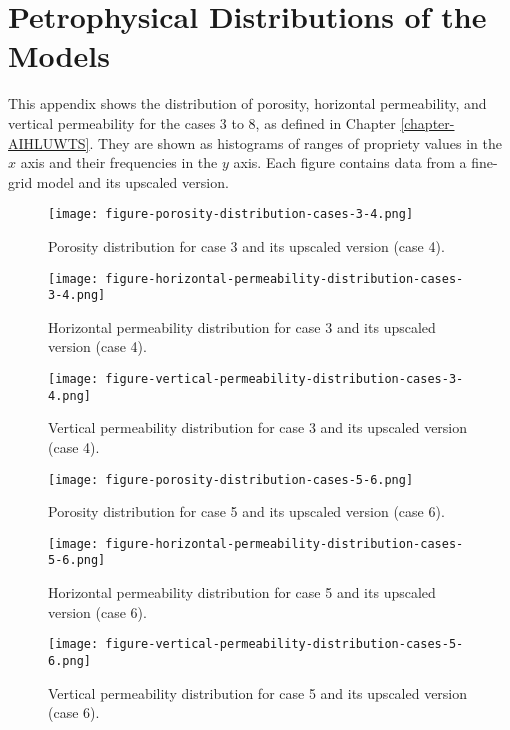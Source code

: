 \chapter{Petrophysical Distributions of the Models}
\label{appendix-models-descriptions}

This appendix shows the distribution of porosity, horizontal permeability, and vertical permeability for the cases 3 to 8, as defined in Chapter \ref{chapter-AIHLUWTS}.
%
They are shown as histograms of ranges of propriety values in the $x$ axis and their frequencies in the $y$ axis. 
%
Each figure contains data from a fine-grid model and its upscaled version.
%
\begin{figure}[H]
	\centering
	\texttt{[image: figure-porosity-distribution-cases-3-4.png]}
	\caption{Porosity distribution for case 3 and its upscaled version (case 4).}
	\label{figure-porosity-distribution-cases-3-4}
\end{figure}
%
\begin{figure}[H]
	\centering
	\texttt{[image: figure-horizontal-permeability-distribution-cases-3-4.png]}
	\caption{Horizontal permeability distribution for case 3 and its upscaled version (case 4).}
\end{figure}
%
\begin{figure}[H]
	\centering
	\texttt{[image: figure-vertical-permeability-distribution-cases-3-4.png]}
	\caption{Vertical permeability distribution for case 3 and its upscaled version (case 4).}
	\label{figure-vertical-permeability-distribution-cases-3-4}
\end{figure}
%
\begin{figure}[H]
	\centering
	\texttt{[image: figure-porosity-distribution-cases-5-6.png]}
	\caption{Porosity distribution for case 5 and its upscaled version (case 6).}
\end{figure}
%
\begin{figure}[H]
	\centering
	\texttt{[image: figure-horizontal-permeability-distribution-cases-5-6.png]}
	\caption{Horizontal permeability distribution for case 5 and its upscaled version (case 6).}
\end{figure}
%
\begin{figure}[H]
	\centering
	\texttt{[image: figure-vertical-permeability-distribution-cases-5-6.png]}
	\caption{Vertical permeability distribution for case 5 and its upscaled version (case 6).}
\end{figure}
